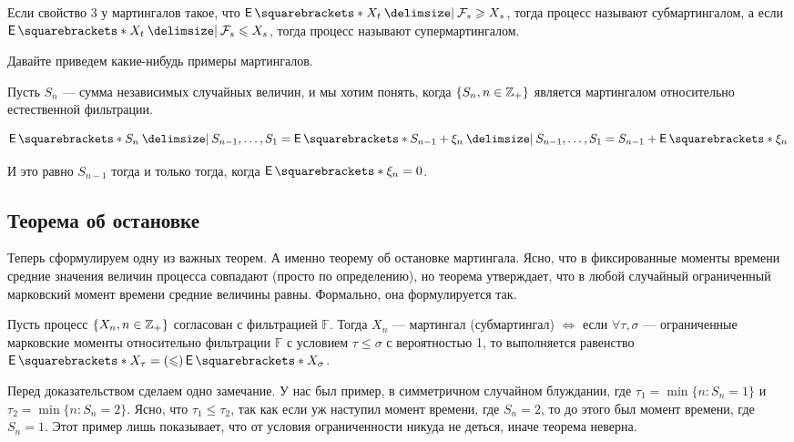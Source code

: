 \begin{definition}
  Если свойство 3 у мартингалов такое, что $\E{X_t \given \F_s} \geq X_s$, тогда
  процесс называют субмартингалом, а если $\E{X_t \given \F_s} \leq X_s$, тогда
  процесс называют супермартингалом.
\end{definition}

Давайте приведем какие-нибудь примеры мартингалов.

\begin{example}
  Пусть $S_n$ --- сумма независимых случайных величин, и мы хотим понять, когда
  $\{S_n, n \in \mathbb{Z}_+\}$ является мартингалом относительно естественной фильтрации.

  \[
    \E{S_n \given S_{n - 1}, \ldots, S_1} = \E{S_{n - 1} + \xi_n \given
    S_{n - 1}, \ldots, S_1} = S_{n - 1} + \E{\xi_n}
  \]

  И это равно $S_{n - 1}$ тогда и только тогда, когда $\E{\xi_n} = 0$.
\end{example}

\subsection{Теорема об остановке}

Теперь сформулируем одну из важных теорем. А именно теорему об остановке мартингала.
Ясно, что в фиксированные моменты времени средние значения величин процесса совпадают
(просто по определению), но теорема утверждает, что в любой случайный 
ограниченный марковский момент времени средние величины равны. Формально, она формулируется так.

\begin{theorem}[Об остановке]
  Пусть процесс $\{X_n, n \in \mathbb{Z}_+\}$ согласован с фильтрацией $\mathbb{F}$. Тогда
  $X_n$ --- мартингал (субмартингал) $\iff$ если $\forall \tau, \sigma$ --- ограниченные
  марковские моменты относительно фильтрации $\mathbb{F}$ с условием $\tau \leq \sigma$
  с вероятностью 1, то выполняется равенство $\E{X_\tau} = (\leq) \E{X_\sigma}$.
\end{theorem}

Перед доказательством сделаем одно замечание. У нас был пример, в
симметричном случайном
блуждании, где $\tau_1 = \min\{n : S_n = 1\}$ и $\tau_2 = \min\{n : S_n = 2\}$.
Ясно, что $\tau_1 \leq \tau_2$, так как если уж наступил момент времени, где
$S_n = 2$, то до этого был момент времени, где $S_n = 1$.
Этот пример лишь показывает, что от условия ограниченности никуда не деться, иначе
теорема неверна.

